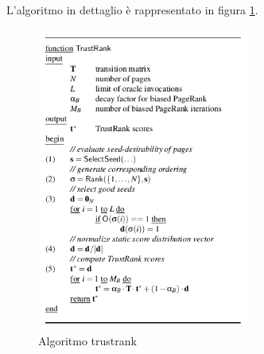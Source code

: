 L'algoritmo in dettaglio è rappresentato in figura \ref{fig:trustrank1}.
\begin{figure}	
\centering
\includegraphics[height=10cm]{immagini/trustrank/trustrank}
\caption{Algoritmo trustrank}
\label{fig:trustrank1}
\end{figure}


